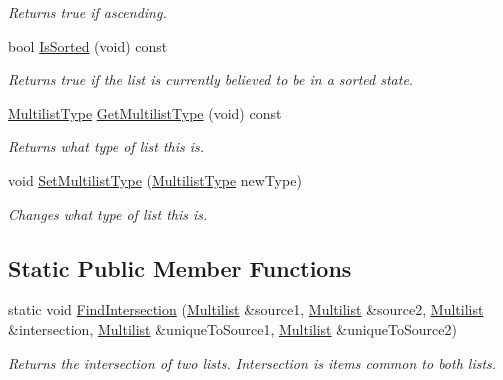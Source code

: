 \begin{DoxyCompactItemize}
\begin{DoxyCompactList}\small\item\em Returns true if ascending. \end{DoxyCompactList}\item 
bool \hyperlink{class_data_structures_1_1_multilist_aacbab3fd63f299185141b0c4a62e9ef5}{Is\-Sorted} (void) const 
\begin{DoxyCompactList}\small\item\em Returns true if the list is currently believed to be in a sorted state. \end{DoxyCompactList}\item 
\hypertarget{class_data_structures_1_1_multilist_ab3a1eb26b60fc9742c3d9d842b1807cc}{\hyperlink{_d_s___multilist_8h_a8387ff66ed3a8c8a6c0528ddb5650a5b}{Multilist\-Type} \hyperlink{class_data_structures_1_1_multilist_ab3a1eb26b60fc9742c3d9d842b1807cc}{Get\-Multilist\-Type} (void) const }\label{class_data_structures_1_1_multilist_ab3a1eb26b60fc9742c3d9d842b1807cc}

\begin{DoxyCompactList}\small\item\em Returns what type of list this is. \end{DoxyCompactList}\item 
void \hyperlink{class_data_structures_1_1_multilist_a054b07faf5e383569219911f18615a39}{Set\-Multilist\-Type} (\hyperlink{_d_s___multilist_8h_a8387ff66ed3a8c8a6c0528ddb5650a5b}{Multilist\-Type} new\-Type)
\begin{DoxyCompactList}\small\item\em Changes what type of list this is. \end{DoxyCompactList}\end{DoxyCompactItemize}
\subsection*{Static Public Member Functions}
\begin{DoxyCompactItemize}
\item 
\hypertarget{class_data_structures_1_1_multilist_a5958435ddcd5ac367ab0406fc797c00a}{static void \hyperlink{class_data_structures_1_1_multilist_a5958435ddcd5ac367ab0406fc797c00a}{Find\-Intersection} (\hyperlink{class_data_structures_1_1_multilist}{Multilist} \&source1, \hyperlink{class_data_structures_1_1_multilist}{Multilist} \&source2, \hyperlink{class_data_structures_1_1_multilist}{Multilist} \&intersection, \hyperlink{class_data_structures_1_1_multilist}{Multilist} \&unique\-To\-Source1, \hyperlink{class_data_structures_1_1_multilist}{Multilist} \&unique\-To\-Source2)}\label{class_data_structures_1_1_multilist_a5958435ddcd5ac367ab0406fc797c00a}

\begin{DoxyCompactList}\small\item\em Returns the intersection of two lists. Intersection is items common to both lists. \end{DoxyCompactList}\end{DoxyCompactItemize}
